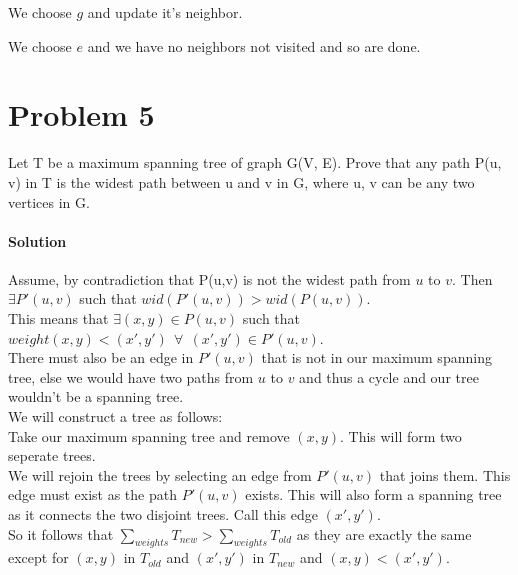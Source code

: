 \documentclass[12pt]{article}
\begin{document}
We choose $g$ and update it's neighbor. \\


We choose $e$ and we have no neighbors not visited and so are done.



\section{Problem 5}
Let T be a maximum spanning tree of graph G(V, E). Prove that any path P(u, v) in T is the widest path between u and v in G, where u, v can be any two vertices in G. 
\paragraph{ Solution }
Assume, by contradiction that P(u,v) is not the widest path from $u$ to $v$.  Then $\exists P'(u,v)$ such that $wid(P'(u,v)) > wid(P(u,v))$. \\
This  means that $\exists (x,y) \in P(u,v)$ such that $weight (x,y) < (x',y') ~~\forall ~~ (x',y') \in P'(u,v)$. \\
There must also be an edge in $P'(u,v)$ that is not in our maximum spanning tree, else we would have two paths from $u$ to $v$ and thus a cycle and
our tree wouldn't be a spanning tree.\\
We will construct a tree as follows:\\
Take our maximum spanning tree and remove $(x,y)$. This will form two seperate trees.\\
We will rejoin the trees by selecting an edge from $P'(u,v)$ that joins them.  This edge must exist as the path $P'(u,v)$ exists.  This will also form a spanning tree as
 it connects the two disjoint trees.  Call this edge $(x',y')$.\\
So it follows that $ \sum\limits_{weights} T_{new} > \sum\limits_{weights} T_{old}$ as they are exactly the same except for $(x,y)$ in $T_{old}$ and $(x',y')$ in $T_{new}$ and
$(x,y) < (x',y')$.
\end{document}
